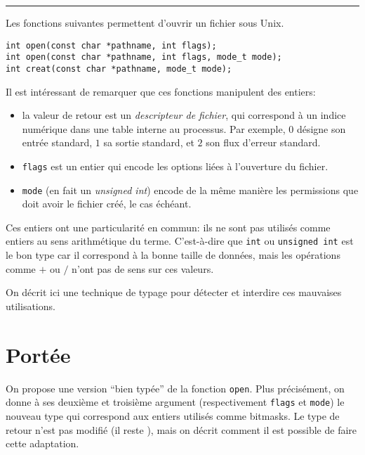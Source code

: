 \begin{center}\rule{3in}{0.4pt}\end{center}

Les fonctions suivantes permettent d'ouvrir un fichier sous Unix.

\begin{verbatim}
int open(const char *pathname, int flags);
int open(const char *pathname, int flags, mode_t mode);
int creat(const char *pathname, mode_t mode);
\end{verbatim}

Il est intéressant de remarquer que ces fonctions manipulent des entiers:

\begin{itemize}

\item la valeur de retour est un \emph{descripteur de fichier}, qui correspond à
un indice numérique dans une table interne au processus. Par exemple, $0$
désigne son entrée standard, $1$ sa sortie standard, et $2$ son flux d'erreur
standard.

\item \texttt{flags} est un entier qui encode les options liées à l'ouverture du
fichier.

\item \texttt{mode} (en fait un \emph{unsigned int}) encode de la même manière
les permissions que doit avoir le fichier créé, le cas échéant.

\end{itemize}

Ces entiers ont une particularité en commun: ils ne sont pas utilisés comme
entiers au sens arithmétique du terme. C'est-à-dire que \texttt{int} ou
\texttt{unsigned int} est le bon type car il correspond à la bonne taille de
données, mais les opérations comme $+$ ou $/$ n'ont pas de sens sur ces valeurs.

On décrit ici une technique de typage pour détecter et interdire ces mauvaises
utilisations.

\section{Portée}

On propose une version ``bien typée'' de la fonction \texttt{open}. Plus
précisément, on donne à ses deuxième et troisième argument (respectivement
\texttt{flags} et \texttt{mode}) le nouveau type \tBits qui correspond aux
entiers utilisés comme bitmasks. Le type de retour n'est pas modifié (il reste
\tInt), mais on décrit comment il est possible de faire cette adaptation.

